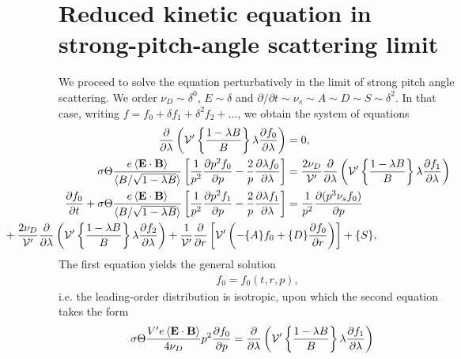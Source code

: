 \documentclass[11pt,a4paper]{article}
\renewcommand{\b}[1]{\ensuremath{ {\bf #1 } }}
\begin{document}



\section{Reduced kinetic equation in strong-pitch-angle scattering limit}
We proceed to solve the equation perturbatively in the limit of strong pitch angle scattering. We order $\nu_D \sim \delta^0$, $E \sim \delta$ and $\partial/\partial t \sim \nu_s \sim A \sim D \sim S \sim \delta^2$. In that case, writing $f=f_0+\delta f_1+\delta^2 f_2 + ...$, we obtain the system of equations
\begin{align}
\frac{\partial}{\partial \lambda}\left(  \mathcal{V'}\left\{\frac{1-\lambda B}{B}\right\} \lambda\frac{\partial f_0}{\partial \lambda}\right) &= 0, \\
\sigma \Theta \frac{e \left\langle \b{E}\cdot\b{B}\right\rangle}{\langle B/\sqrt{1-\lambda B} \rangle}\left[\frac{1}{p^2}\frac{\partial p^2 f_0}{\partial p}  - \frac{2}{p}\frac{\partial \lambda f_0}{\partial \lambda}\right] &=  \frac{2\nu_D}{\mathcal{V}'}\frac{\partial}{\partial \lambda}\left(  \mathcal{V'}\left\{\frac{1-\lambda B}{B}\right\} \lambda\frac{\partial f_1}{\partial \lambda}\right) \\
%
\frac{\partial f_0}{\partial t} + \sigma \Theta \frac{e \left\langle \b{E}\cdot\b{B}\right\rangle}{\langle B/\sqrt{1-\lambda B} \rangle}\left[\frac{1}{p^2}\frac{\partial p^2 f_1}{\partial p}  - \frac{2}{p}\frac{\partial \lambda f_1}{\partial \lambda}\right]  &= \frac{1}{p^2}\frac{\partial(p^3 \nu_s f_0)}{\partial p} \nonumber \\
&\hspace{-90mm}+ \frac{2\nu_D}{\mathcal{V}'}\frac{\partial}{\partial \lambda}\left(  \mathcal{V'}\left\{\frac{1-\lambda B}{B}\right\} \lambda\frac{\partial f_2}{\partial \lambda}\right)+\frac{1}{\mathcal{V}'}\frac{\partial}{\partial r}\left[ \mathcal{V'}\left(-\{A\}f_0+ \{D\}\frac{\partial f_0}{\partial r} \right) \right] + \{S\},
\end{align}
The first equation yields the general solution
\begin{align}
f_0 = f_0(t,r,p),
\end{align}
i.e. the leading-order distribution is isotropic, upon which the second equation takes the form
\begin{align}
\sigma \Theta \frac{V'e \left\langle \b{E}\cdot\b{B}\right\rangle}{4\nu_D}p^2\frac{\partial  f_0}{\partial p} &=  \frac{\partial}{\partial \lambda}\left(  \mathcal{V'}\left\{\frac{1-\lambda B}{B}\right\} \lambda\frac{\partial f_1}{\partial \lambda}\right) 
\end{align}
\end{document}
